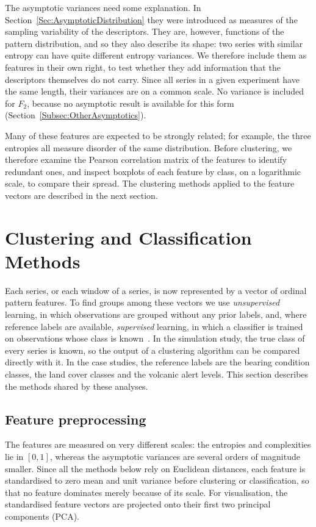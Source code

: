 The asymptotic variances need some explanation. In Section~\ref{Sec:AsymptoticDistribution} they were introduced as measures of the sampling variability of the descriptors. They are, however, functions of the pattern distribution, and so they also describe its shape: two series with similar entropy can have quite different entropy variances. We therefore include them as features in their own right, to test whether they add information that the descriptors themselves do not carry. Since all series in a given experiment have the same length, their variances are on a common scale. No variance is included for $F_2$, because no asymptotic result is available for this form (Section~\ref{Subsec:OtherAsymptotics}).

Many of these features are expected to be strongly related; for example, the three entropies all measure disorder of the same distribution. Before clustering, we therefore examine the Pearson correlation matrix of the features to identify redundant ones, and inspect boxplots of each feature by class, on a logarithmic scale, to compare their spread. The clustering methods applied to the feature vectors are described in the next section.

\section{Clustering and Classification Methods}\label{Sec:Clustering}

Each series, or each window of a series, is now represented by a vector of ordinal pattern features. To find groups among these vectors we use \emph{unsupervised} learning, in which observations are grouped without any prior labels, and, where reference labels are available, \emph{supervised} learning, in which a classifier is trained on observations whose class is known~\cite{HardleSimarFengler2024}. In the simulation study, the true class of every series is known, so the output of a clustering algorithm can be compared directly with it. In the case studies, the reference labels are the bearing condition classes, the land cover classes and the volcanic alert levels. This section describes the methods shared by these analyses.

\subsection{Feature preprocessing}\label{Subsec:Preprocessing}

The features are measured on very different scales: the entropies and complexities lie in $[0,1]$, whereas the asymptotic variances are several orders of magnitude smaller. Since all the methods below rely on Euclidean distances, each feature is standardised to zero mean and unit variance before clustering or classification, so that no feature dominates merely because of its scale. For visualisation, the standardised feature vectors are projected onto their first two principal components (PCA).


